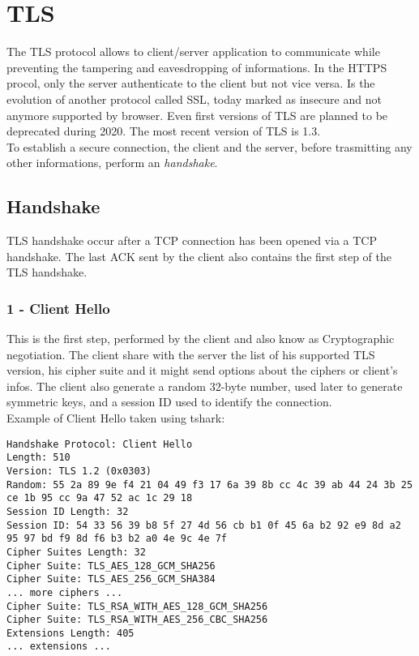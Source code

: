 \section{TLS}
The TLS protocol allows to client/server application to communicate while preventing the tampering and eavesdropping of informations. In the HTTPS procol, only the server authenticate to the client but not vice versa. Is the evolution of another protocol called SSL, today marked as insecure and not anymore supported by browser. Even first versions of TLS are planned to be deprecated during 2020. The most recent version of TLS is 1.3.\\
To establish a secure connection, the client and the server, before trasmitting any other informations, perform an \emph{handshake}.
\subsection{Handshake}
TLS handshake occur after a TCP connection has been opened via a TCP handshake. The last ACK sent by the client also contains the first step of the TLS handshake.
\subsubsection{1 - Client Hello}
This is the first step, performed by the client and also know as Cryptographic negotiation. The client share with the server the list of his supported TLS version, his cipher suite and it might send options about the ciphers or client's infos. The client also generate a random 32-byte number, used later to generate symmetric keys, and a session ID used to identify the connection.\\
Example of Client Hello taken using tshark:
\begin{lstlisting}
Handshake Protocol: Client Hello
Length: 510
Version: TLS 1.2 (0x0303)
Random: 55 2a 89 9e f4 21 04 49 f3 17 6a 39 8b cc 4c 39 ab 44 24 3b 25 ce 1b 95 cc 9a 47 52 ac 1c 29 18
Session ID Length: 32
Session ID: 54 33 56 39 b8 5f 27 4d 56 cb b1 0f 45 6a b2 92 e9 8d a2 95 97 bd f9 8d f6 b3 b2 a0 4e 9c 4e 7f
Cipher Suites Length: 32
Cipher Suite: TLS_AES_128_GCM_SHA256
Cipher Suite: TLS_AES_256_GCM_SHA384
... more ciphers ...
Cipher Suite: TLS_RSA_WITH_AES_128_GCM_SHA256
Cipher Suite: TLS_RSA_WITH_AES_256_CBC_SHA256
Extensions Length: 405
... extensions ...
\end{lstlisting}

